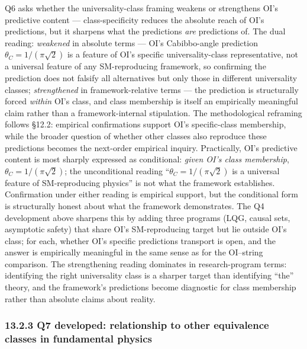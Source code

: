 \documentclass[
]{article}
\begin{document}
Q6 asks whether the universality-class framing weakens or strengthens
OI's predictive content --- class-specificity reduces the absolute reach
of OI's predictions, but it sharpens what the predictions \emph{are}
predictions of. The dual reading: \emph{weakened} in absolute terms ---
OI's Cabibbo-angle prediction \(\theta_C = 1/(\pi\sqrt{2})\) is a
feature of OI's specific universality-class representative, not a
universal feature of any SM-reproducing framework, so confirming the
prediction does not falsify all alternatives but only those in different
universality classes; \emph{strengthened} in framework-relative terms
--- the prediction is structurally forced \emph{within} OI's class, and
class membership is itself an empirically meaningful claim rather than a
framework-internal stipulation. The methodological reframing follows
§12.2: empirical confirmations support OI's specific-class membership,
while the broader question of whether other classes also reproduce these
predictions becomes the next-order empirical inquiry. Practically, OI's
predictive content is most sharply expressed as conditional: \emph{given
OI's class membership}, \(\theta_C = 1/(\pi\sqrt{2})\); the
unconditional reading ``\(\theta_C = 1/(\pi\sqrt{2})\) is a universal
feature of SM-reproducing physics'' is not what the framework
establishes. Confirmation under either reading is empirical support, but
the conditional form is structurally honest about what the framework
demonstrates. The Q4 development above sharpens this by adding three
programs (LQG, causal sets, asymptotic safety) that share OI's
SM-reproducing target but lie outside OI's class; for each, whether OI's
specific predictions transport is open, and the answer is empirically
meaningful in the same sense as for the OI--string comparison. The
strengthening reading dominates in research-program terms: identifying
the right universality class is a sharper target than identifying
``the'' theory, and the framework's predictions become diagnostic for
class membership rather than absolute claims about reality.

\hypertarget{q7-developed-relationship-to-other-equivalence-classes-in-fundamental-physics}{%
\subsubsection{13.2.3 Q7 developed: relationship to other equivalence
classes in fundamental
physics}\label{q7-developed-relationship-to-other-equivalence-classes-in-fundamental-physics}}
\end{document}
